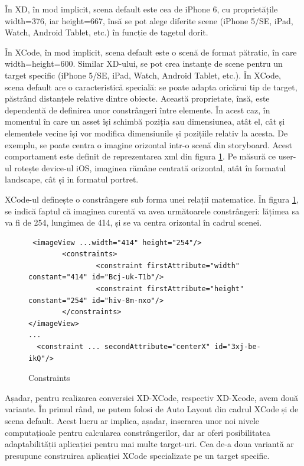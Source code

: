 În XD, în mod implicit, scena default este cea de iPhone 6, cu proprietățile width=376, iar height=667, însă se pot alege diferite scene (iPhone 5/SE, iPad, Watch, Android Tablet, etc.) în funcție de tagetul dorit. 

În XCode, în mod implicit, scena default este o scenă de format pătratic, în care width=height=600. Similar XD-ului, se pot crea instanțe de scene pentru un target specific (iPhone 5/SE, iPad, Watch, Android Tablet, etc.). În XCode, scena default are o caracteristică specială: se poate adapta oricărui tip de target, păstrând distanțele relative dintre obiecte. Această proprietate, însă, este dependentă de definirea unor constrângeri între elemente. În acest caz, în momentul în care un asset își schimbă poziția sau dimensiunea, atât el, cât și elementele vecine își vor modifica dimensiunile și pozițiile relativ la acesta. De exemplu, se poate centra o imagine orizontal intr-o scenă din storyboard. Acest comportament este definit de reprezentarea xml din figura \ref{fig:Constraints}. Pe măsură ce user-ul rotește device-ul iOS, imaginea rămâne centrată orizontal, atât în formatul landscape, cât și in formatul portret.

XCode-ul definește o constrângere sub forma unei relații matematice. În figura \ref{fig:Constraints}, se indică faptul că imaginea curentă va avea următoarele constrângeri: lățimea sa va fi de 254, lungimea de 414, și se va centra orizontal în cadrul scenei.  

\begin{figure}[!htbp]
\lstset{language=XML}
\begin{lstlisting}
 <imageView ...width="414" height="254"/>
        <constraints>
                <constraint firstAttribute="width" constant="414" id="Bcj-uk-T1b"/>
                <constraint firstAttribute="height" constant="254" id="hiv-8m-nxo"/>
        </constraints>
</imageView>
...
  <constraint ... secondAttribute="centerX" id="3xj-be-ikQ"/>
\end{lstlisting}
\caption{Constraints} \label{fig:Constraints}
\end{figure}

Așadar, pentru realizarea conversiei XD-XCode, respectiv XD-Xcode, avem două variante. În primul rând, ne putem folosi de Auto Layout din cadrul XCode și de scena default. Acest lucru ar implica, așadar, inserarea unor noi nivele computațioale pentru calcularea constrângerilor, dar ar oferi posibilitatea adaptabilității aplicației pentru mai multe target-uri.
Cea de-a doua variantă ar presupune construirea aplicației XCode specializate pe un target specific. 

